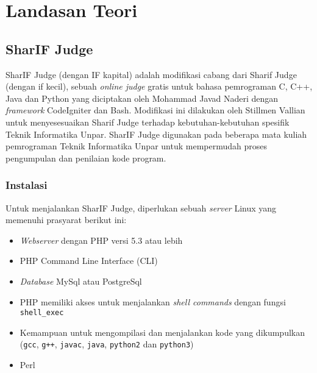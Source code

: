 \chapter{Landasan Teori}
\label{chap:teori}

\section{SharIF Judge}
\label{sec:2:sharif}

SharIF Judge (dengan IF kapital) adalah modifikasi cabang dari Sharif Judge (dengan if kecil), sebuah \textit{online judge} gratis untuk bahasa pemrograman C, C++, Java dan Python yang diciptakan oleh Mohammad Javad Naderi dengan \textit{framework} CodeIgniter dan Bash\cite{sharif}. Modifikasi ini dilakukan oleh Stillmen Vallian untuk menyesesuaikan Sharif Judge terhadap kebutuhan-kebutuhan spesifik Teknik Informatika Unpar. SharIF Judge digunakan pada beberapa mata kuliah pemrograman Teknik Informatika Unpar untuk mempermudah proses pengumpulan dan penilaian kode program. \cite{stillmen:sharif}

\subsection{Instalasi}
\label{subs:2:instalasi}
Untuk menjalankan SharIF Judge, diperlukan sebuah \textit{server} Linux yang memenuhi prasyarat berikut ini:
\begin{itemize}
    \item \textit{Webserver} dengan PHP versi 5.3 atau lebih
    \item PHP Command Line Interface (CLI)
    \item \textit{Database} MySql atau PostgreSql
    \item PHP memiliki akses untuk menjalankan \textit{shell commands} dengan fungsi \verb|shell_exec|
    \item Kemampuan untuk mengompilasi dan menjalankan kode yang dikumpulkan (\texttt{gcc}, \texttt{g++}, \texttt{javac}, \texttt{java}, \texttt{python2} dan \texttt{python3})
    \item Perl
\end{itemize}

